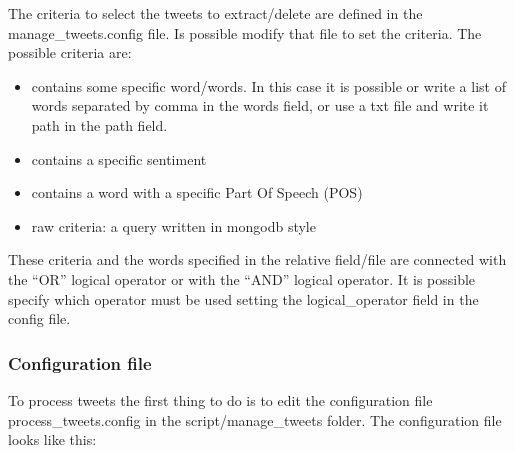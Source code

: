 \documentclass[letterpaper,10pt,english]{sphinxmanual}
\begin{document}
\sphinxAtStartPar
The criteria to select the tweets to extract/delete are defined in the manage\_tweets.config file.
Is possible modify that file to set the criteria.
The possible criteria are:
\begin{itemize}
\item {} 
\sphinxAtStartPar
contains some specific word/words. In this case it is possible or write a list of words separated by comma in the words field, or use a txt file and write it path in the path field.

\item {} 
\sphinxAtStartPar
contains a specific sentiment

\item {} 
\sphinxAtStartPar
contains a word with a specific Part Of Speech (POS)

\item {} 
\sphinxAtStartPar
raw criteria: a query written in mongodb style

\end{itemize}

\sphinxAtStartPar
These criteria and the words specified in the relative field/file are connected with the “OR” logical operator
or with the “AND” logical operator. It is possible specify which operator must be used setting the logical\_operator field in the config file.


\subsubsection{Configuration file}
\label{\detokenize{guide/manage_tweets_guide:configuration-file}}
\sphinxAtStartPar
To process tweets the first thing to do is to edit the configuration file process\_tweets.config in the script/manage\_tweets folder.
The configuration file looks like this:

\begin{sphinxVerbatim}[commandchars=\\\{\}]
     
   
\end{sphinxVerbatim}
\end{document}
